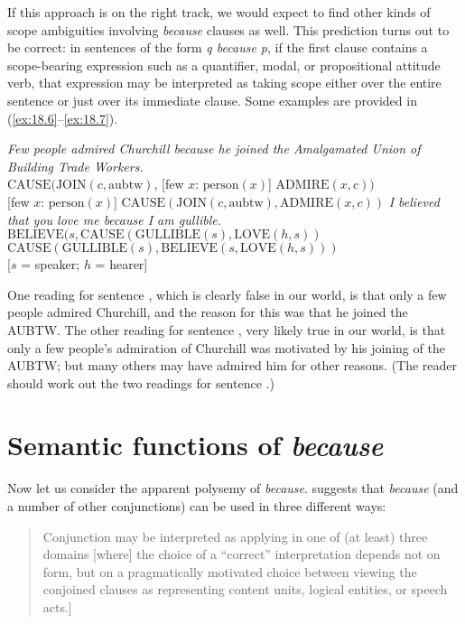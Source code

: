 If this approach is on the right track, we would expect to find other kinds of scope ambiguities involving \textit{because} clauses as well. This prediction turns out to be correct: in sentences of the form \textit{q because p}, if the first clause contains a scope-bearing expression such as a quantifier, modal, or propositional attitude verb, that expression may be interpreted as taking scope either over the entire sentence or just over its immediate clause. Some examples are provided in (\ref{ex:18.6}--\ref{ex:18.7}).


\ea \label{ex:18.6}
\textit{Few people admired Churchill because he joined the Amalgamated Union of Building Trade Workers.}\\
\ea  $\text{CAUSE}(\text{JOIN}(c,\text{aubtw})$, [few $x$: $\text{person}(x)$] $\text{ADMIRE}(x,c))$\\
\ex{} [few $x$: $\text{person}(x)$] $\text{CAUSE}(\text{JOIN}(c,\text{aubtw}), \text{ADMIRE}(x,c))$
                       \z
\ex \label{ex:18.7}
\textit{I believed that you love me because I am gullible.}\\
\ea  $\text{BELIEVE}(s, \text{CAUSE}(\text{GULLIBLE}(s), \text{LOVE}(h,s))$\\
\ex $\text{CAUSE}(\text{GULLIBLE}(s), \text{BELIEVE}(s, \text{LOVE}(h,s)))$\\
    {}[$s$ = speaker; $h$ = hearer]
                       \z
\z


One reading for sentence , which is clearly false in our world, is that only a few people admired Churchill, and the reason for this was that he joined the AUBTW. The other reading for sentence , very likely true in our world, is that only a few people’s admiration of Churchill was motivated by his joining of the AUBTW; but many others may have admired him for other reasons. (The reader should work out the two readings for sentence .)


\section{Semantic functions of  \textit{because}}\label{sec:18.3}

Now let us consider the apparent polysemy of \textit{because}. \citet[76--78]{Sweetser1990} suggests that \textit{because} (and a number of other conjunctions) can be used in three different ways: 


\begin{quote}
Conjunction may be interpreted as applying in one of (at least) three domains [where] the choice of a “correct” interpretation depends not on form, but on a pragmatically motivated choice between viewing the conjoined clauses as representing content units, logical entities, or speech acts.\newline [\citeyear[78]{Sweetser1990}]
\end{quote}

